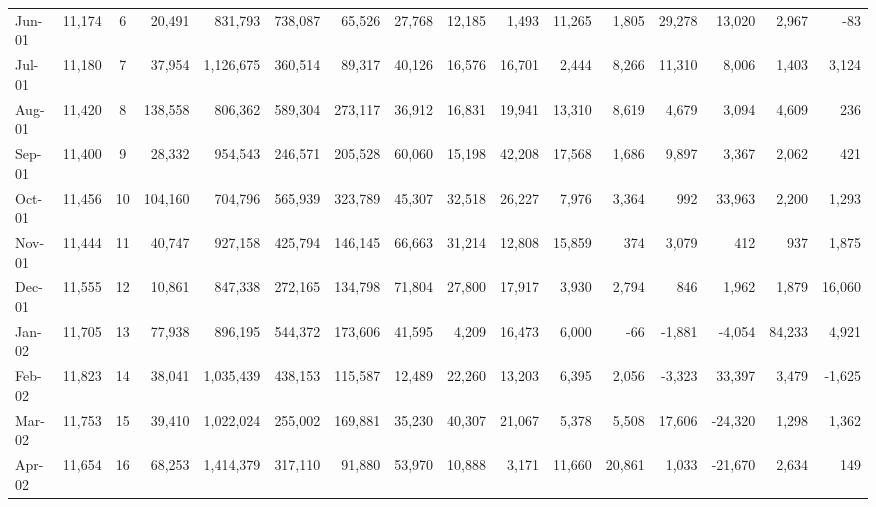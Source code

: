 \begin{exercises}
\begin{table}
\begin{center}
\begin{tabular}{lrcrrrrrrrrrrrrr}
    Jun-01 &     11,174 &          6 &     20,491 &    831,793 &    738,087 &     65,526 &     27,768 &     12,185 &      1,493 &     11,265 &      1,805 &     29,278 &     13,020 &      2,967 &        -83 \\
    Jul-01 &     11,180 &          7 &     37,954 &  1,126,675 &    360,514 &     89,317 &     40,126 &     16,576 &     16,701 &      2,444 &      8,266 &     11,310 &      8,006 &      1,403 &      3,124 \\
    Aug-01 &     11,420 &          8 &    138,558 &    806,362 &    589,304 &    273,117 &     36,912 &     16,831 &     19,941 &     13,310 &      8,619 &      4,679 &      3,094 &      4,609 &        236 \\
    Sep-01 &     11,400 &          9 &     28,332 &    954,543 &    246,571 &    205,528 &     60,060 &     15,198 &     42,208 &     17,568 &      1,686 &      9,897 &      3,367 &      2,062 &        421 \\
    Oct-01 &     11,456 &         10 &    104,160 &    704,796 &    565,939 &    323,789 &     45,307 &     32,518 &     26,227 &      7,976 &      3,364 &        992 &     33,963 &      2,200 &      1,293 \\
    Nov-01 &     11,444 &         11 &     40,747 &    927,158 &    425,794 &    146,145 &     66,663 &     31,214 &     12,808 &     15,859 &        374 &      3,079 &        412 &        937 &      1,875 \\
    Dec-01 &     11,555 &         12 &     10,861 &    847,338 &    272,165 &    134,798 &     71,804 &     27,800 &     17,917 &      3,930 &      2,794 &        846 &      1,962 &      1,879 &     16,060 \\
    Jan-02 &     11,705 &         13 &     77,938 &    896,195 &    544,372 &    173,606 &     41,595 &      4,209 &     16,473 &      6,000 &        -66 &     -1,881 &     -4,054 &     84,233 &      4,921 \\
    Feb-02 &     11,823 &         14 &     38,041 &  1,035,439 &    438,153 &    115,587 &     12,489 &     22,260 &     13,203 &      6,395 &      2,056 &     -3,323 &     33,397 &      3,479 &     -1,625 \\
    Mar-02 &     11,753 &         15 &     39,410 &  1,022,024 &    255,002 &    169,881 &     35,230 &     40,307 &     21,067 &      5,378 &      5,508 &     17,606 &    -24,320 &      1,298 &      1,362 \\
    Apr-02 &     11,654 &         16 &     68,253 &  1,414,379 &    317,110 &     91,880 &     53,970 &     10,888 &      3,171 &     11,660 &     20,861 &      1,033 &    -21,670 &      2,634 &        149 \\

\end{tabular}
\end{center}
\end{table}
\end{exercises}
